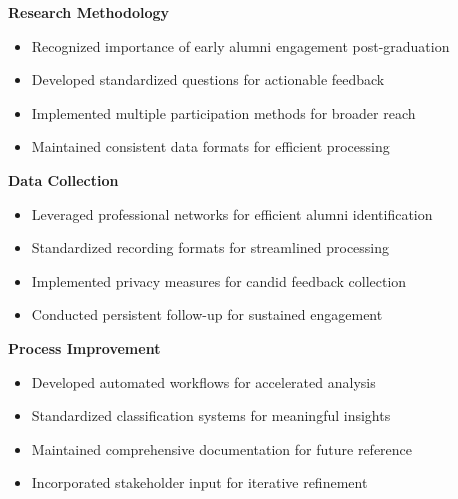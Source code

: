 \documentclass[12pt,a4paper]{article}
\begin{document}
\noindent\textbf{Research Methodology}
\begin{itemize}
\item Recognized importance of early alumni engagement post-graduation
\item Developed standardized questions for actionable feedback
\item Implemented multiple participation methods for broader reach
\item Maintained consistent data formats for efficient processing
\end{itemize}
\textbf{Data Collection}
\begin{itemize}
\item Leveraged professional networks for efficient alumni identification
\item Standardized recording formats for streamlined processing
\item Implemented privacy measures for candid feedback collection
\item Conducted persistent follow-up for sustained engagement
\end{itemize}
\textbf{Process Improvement}
\begin{itemize}
\item Developed automated workflows for accelerated analysis
\item Standardized classification systems for meaningful insights
\item Maintained comprehensive documentation for future reference
\item Incorporated stakeholder input for iterative refinement
\end{itemize}

\newpage
\end{document}

